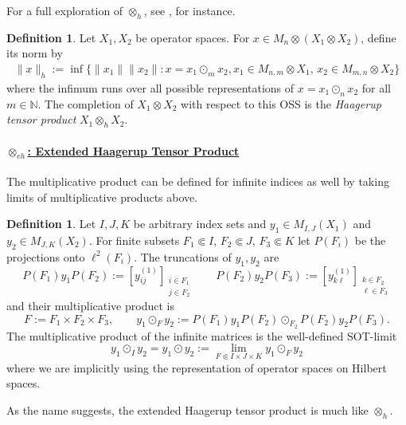 \documentclass[12pt]{article}
\theoremstyle{definition}
\newtheorem{definition}[theorem]{Definition}
\newcommand{\N}{\mathbb N}
\newcommand{\<}{\langle}
\renewcommand{\>}{\rangle}
\newcommand{\eh}{\otimes_{eh}}
\newcommand{\h}{\otimes_{h}}
\begin{document}
For a full exploration of $\h$, see \cite[Chapter 5]{intro-op-sp-pisier}, for instance.

\begin{definition} \cite[Equation 5.4]{opsp-hopf} \label{defn: h}
    Let $X_1, X_2$ be operator spaces. For $x \in M_n \otimes (X_1 \otimes X_2)$, define its norm by
    \begin{align*}
        \|x\|_h := \inf \{\|x_1\| \|x_2\| : x = x_1 \odot_m x_2, x_1 \in M_{n,m} \otimes X_1 , \,  x_2 \in M_{m,n} \otimes X_2\}
    \end{align*}
    where the infimum runs over all possible representations of $x = x_1 \odot_n x_2$ for all $m \in \N$. The completion of $X_1 \otimes X_2$ with respect to this OSS is the \textit{Haagerup tensor product} $X_1 \h X_2$.
\end{definition}

\paragraph{\underline{$\eh$: Extended Haagerup Tensor Product}}

The multiplicative product can be defined for infinite indices as well by taking limits of multiplicative products above.

\begin{definition}  \label{defn: mult-prod-inf}
Let $I,J,K$ be arbitrary index sets and $y_1 \in M_{I,J}(X_1)$ and $y_2 \in M_{J,K}(X_2)$. For finite subsets $F_1 \Subset I$, $F_2 \Subset J$, $F_3 \Subset K$ let $P(F_i)$ be the projections onto $\ell^2(F_i)$. The truncations of $y_1, y_2$ are
    \[
    P(F_1)y_1P(F_2) := [y_{ij}^{(1)}]_{\substack{i \in F_1 \\ j \in F_2}} \qquad P(F_2)y_2P(F_3) := [y_{k\ell}^{(1)}]_{\substack{k \in F_2 \\ \ell \in F_3}}
    \]
    and their multiplicative product is
    \[
    F:= F_1 \times F_2 \times F_3, \qquad y_1 \odot_F y_2 := P(F_1)y_1P(F_2) \odot_{F_2} P(F_2)y_2P(F_3).
    \]
    The multiplicative product of the infinite matrices is the well-defined SOT-limit
    \[
    y_1 \odot_I y_2 = y_1 \odot y_2 := \lim_{F \Subset I \times J \times K} y_1 \odot_F y_2
    \]
    where we are implicitly using the representation of operator spaces on Hilbert spaces.
\end{definition}

As the name suggests, the extended Haagerup tensor product is much like $\h$.
\end{document}
